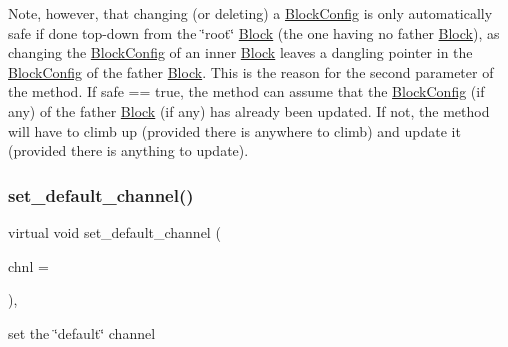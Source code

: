 Note, however, that changing (or deleting) a \mbox{\hyperlink{class_s_m_spp__di__unipi__it_1_1_block_config}{Block\+Config}} is only automatically safe if done top-\/down from the \char`\"{}root\char`\"{} \mbox{\hyperlink{class_s_m_spp__di__unipi__it_1_1_block}{Block}} (the one having no father \mbox{\hyperlink{class_s_m_spp__di__unipi__it_1_1_block}{Block}}), as changing the \mbox{\hyperlink{class_s_m_spp__di__unipi__it_1_1_block_config}{Block\+Config}} of an inner \mbox{\hyperlink{class_s_m_spp__di__unipi__it_1_1_block}{Block}} leaves a dangling pointer in the \mbox{\hyperlink{class_s_m_spp__di__unipi__it_1_1_block_config}{Block\+Config}} of the father \mbox{\hyperlink{class_s_m_spp__di__unipi__it_1_1_block}{Block}}. This is the reason for the second parameter of the method. If safe == true, the method can assume that the \mbox{\hyperlink{class_s_m_spp__di__unipi__it_1_1_block_config}{Block\+Config}} (if any) of the father \mbox{\hyperlink{class_s_m_spp__di__unipi__it_1_1_block}{Block}} (if any) has already been updated. If not, the method will have to climb up (provided there is anywhere to climb) and update it (provided there is anything to update). \mbox{\label{class_s_m_spp__di__unipi__it_1_1_block_ae1e61f1d3f7185b6824f02488901a0ad}} 
\subsubsection{\texorpdfstring{set\+\_\+default\+\_\+channel()}{set\_default\_channel()}}
{\footnotesize\ttfamily virtual void set\+\_\+default\+\_\+channel (\begin{DoxyParamCaption}\item[{\mbox{\hyperlink{class_s_m_spp__di__unipi__it_1_1_observer_aa9ad8de42ffaf90023bfed5c085ad8bc}{c\+\_\+\+Chnl\+Name}}}]{chnl = {} }\end{DoxyParamCaption})\hspace{0.3cm}{\ttfamily [override]}, {\ttfamily [virtual]}}



set the \char`\"{}default\char`\"{} channel 

